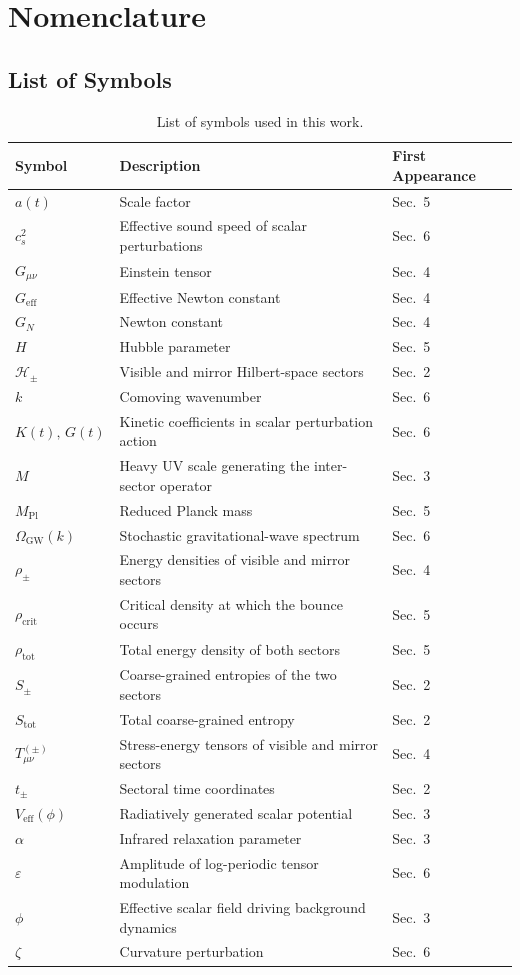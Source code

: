 \documentclass[11pt,a4paper]{article}
\begin{document}
\clearpage

\section*{Nomenclature}

\subsection*{List of Symbols}

\begin{longtable}{lll}
\caption{List of symbols used in this work.}\\
\textbf{Symbol} & \textbf{Description} & \textbf{First Appearance} \\
\hline
$a(t)$ & Scale factor & Sec.~5 \\
$c_{s}^{2}$ & Effective sound speed of scalar perturbations & Sec.~6 \\
$G_{\mu\nu}$ & Einstein tensor & Sec.~4 \\
$G_{\mathrm{eff}}$ & Effective Newton constant & Sec.~4 \\
$G_{N}$ & Newton constant & Sec.~4 \\
$H$ & Hubble parameter & Sec.~5 \\
$\mathcal{H}_{\pm}$ & Visible and mirror Hilbert-space sectors & Sec.~2 \\
$k$ & Comoving wavenumber & Sec.~6 \\
$K(t),\,G(t)$ & Kinetic coefficients in scalar perturbation action & Sec.~6 \\
$M$ & Heavy UV scale generating the inter-sector operator & Sec.~3 \\
$M_{\mathrm{Pl}}$ & Reduced Planck mass & Sec.~5 \\
$\Omega_{\mathrm{GW}}(k)$ & Stochastic gravitational-wave spectrum & Sec.~6 \\
$\rho_{\pm}$ & Energy densities of visible and mirror sectors & Sec.~4 \\
$\rho_{\mathrm{crit}}$ & Critical density at which the bounce occurs & Sec.~5 \\
$\rho_{\mathrm{tot}}$ & Total energy density of both sectors & Sec.~5 \\
$S_{\pm}$ & Coarse-grained entropies of the two sectors & Sec.~2 \\
$S_{\mathrm{tot}}$ & Total coarse-grained entropy & Sec.~2 \\
$T^{(\pm)}_{\mu\nu}$ & Stress-energy tensors of visible and mirror sectors & Sec.~4 \\
$t_{\pm}$ & Sectoral time coordinates & Sec.~2 \\
$V_{\mathrm{eff}}(\phi)$ & Radiatively generated scalar potential & Sec.~3 \\
$\alpha$ & Infrared relaxation parameter & Sec.~3 \\
$\varepsilon$ & Amplitude of log-periodic tensor modulation & Sec.~6 \\
$\phi$ & Effective scalar field driving background dynamics & Sec.~3 \\
$\zeta$ & Curvature perturbation & Sec.~6 \\
\end{longtable}
\end{document}

